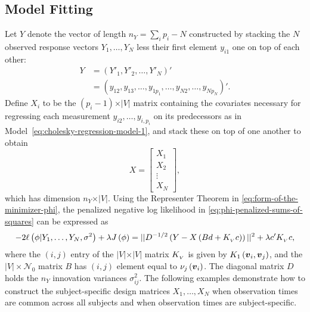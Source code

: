 \subsection{Model Fitting}

Let $Y$ denote the vector of length $n_Y= \sum_{i} p_i - N$  constructed by stacking the $N$ observed response vectors $Y_1,\dots, Y_N$ less their first element $y_{i1}$ one on top of each other:
\begin{align}\label{eq:stacked-response-vector}
Y &= \left( Y'_1, Y'_2, \dots, Y'_{N} \right)'\\
 &= \left( y_{12}, y_{13},\dots, y_{1p_1}, \dots, y_{N2},\dots, y_{Np_N} \right)'.
\end{align}
\noindent
Define $X_i$ to be the $\left(p_i-1\right) \times \vert V \vert$ matrix containing the covariates necessary for regressing each measurement $y_{i2}, \dots, y_{i,p_i}$ on its predecessors as in Model~\eqref{eq:cholesky-regression-model-1}, and stack these on top of one another to obtain
\begin{equation} \label{eq:ar-design-matrix-1}
X = \begin{bmatrix}
X_1 \\
X_2\\
\vdots \\
X_N
\end{bmatrix},
\end{equation}
\noindent
which has dimension $n_Y \times \vert V \vert$. Using the Representer Theorem in \eqref{eq:form-of-the-minimizer-phi}, the penalized negative log likelihood in \eqref{eq:phi-penalized-sums-of-squares} can be expressed as
\begin{equation} \label{eq:penalized-likelihood-vectorized}
-2\ell\left(\phi \vert Y_1,\dots, Y_N, \sigma^2\right) + \lambda J\left(\phi\right) = \vert \vert D^{-1/2}\left( Y - X \left( Bd + K_{_{\scriptscriptstyle V}}c \right) \right) \vert \vert^2  + \lambda c^\prime K_{_{\scriptscriptstyle V}} c, 
\end{equation}
\noindent
where the $\left(i,j\right)$ entry of the $\vert V \vert \times \vert V \vert$ matrix $K_{_{\scriptscriptstyle V}}$ is given by $K_1\left(\mbox{\boldmath $v$}_i, \mbox{\boldmath $v$}_j\right)$, and the $\vert V \vert \times \mathcal{N}_0$ matrix $B$ has $\left(i,j\right)$ element equal to $\nu_j\left(\mbox{\boldmath $v$}_i\right)$.  The diagonal matrix $D$ holds the $n_Y$  innovation variances $\sigma^2_{ij}$. The following examples demonstrate how to construct the subject-specific design matrices $X_1,\dots, X_N$ when observation times are common across all subjects and when observation times are subject-specific.

